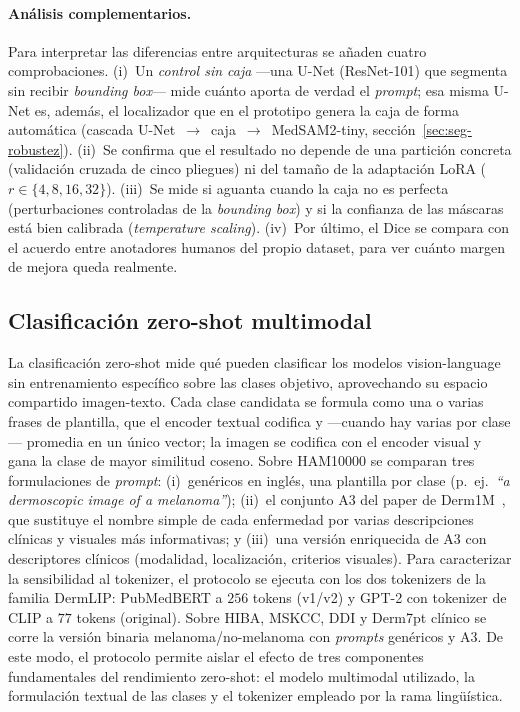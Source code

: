 \paragraph{Análisis complementarios.}
Para interpretar las diferencias entre arquitecturas se añaden cuatro
comprobaciones. (i)~Un \emph{control sin caja} ---una U-Net
(ResNet-101) que segmenta sin recibir \emph{bounding box}--- mide
cuánto aporta de verdad el \emph{prompt}; esa misma U-Net es, además,
el localizador que en el prototipo genera la caja de forma automática
(cascada U-Net~$\to$~caja~$\to$~MedSAM2-tiny,
sección~\ref{sec:seg-robustez}). (ii)~Se confirma que el resultado no
depende de una partición concreta (validación cruzada de cinco
pliegues) ni del tamaño de la adaptación LoRA ($r\in\{4,8,16,32\}$).
(iii)~Se mide si aguanta cuando la caja no es perfecta (perturbaciones
controladas de la \emph{bounding box}) y si la confianza de las
máscaras está bien calibrada (\emph{temperature scaling}). (iv)~Por
último, el Dice se compara con el acuerdo entre anotadores humanos del
propio dataset, para ver cuánto margen de mejora queda realmente.

\subsection{Clasificación zero-shot multimodal}
\label{sec:zs}

La clasificación zero-shot mide qué pueden clasificar los modelos
vision-language sin entrenamiento específico sobre las clases objetivo,
aprovechando su espacio compartido imagen-texto. Cada clase candidata se
formula como una o varias frases de plantilla, que el encoder textual
codifica y ---cuando hay varias por clase--- promedia en un único
vector; la imagen se codifica con el encoder visual y gana la clase de
mayor similitud coseno. Sobre HAM10000 se comparan tres formulaciones de
\emph{prompt}: (i)~genéricos en inglés, una plantilla por clase
(p.~ej.~\emph{``a dermoscopic image of a melanoma''});
(ii)~el conjunto A3 del paper de Derm1M~\cite{derm1m}, que sustituye el
nombre simple de cada enfermedad por varias descripciones clínicas y
visuales más informativas; y (iii)~una versión enriquecida de A3 con
descriptores clínicos (modalidad, localización, criterios visuales).
Para caracterizar la sensibilidad al tokenizer, el protocolo se
ejecuta con los dos tokenizers de la familia DermLIP: PubMedBERT
a $256$ tokens (v1/v2) y GPT-2 con tokenizer de CLIP a $77$
tokens (original). Sobre HIBA, MSKCC, DDI y Derm7pt clínico se corre
la versión binaria melanoma/no-melanoma con \emph{prompts}
genéricos y A3. De este modo, el protocolo permite aislar el efecto
de tres componentes fundamentales del rendimiento zero-shot: el
modelo multimodal utilizado, la formulación textual de las clases y
el tokenizer empleado por la rama lingüística.

